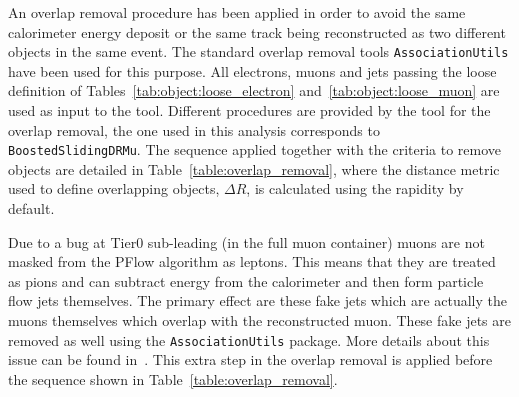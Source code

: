 An overlap removal procedure has been applied in order to avoid the same calorimeter energy deposit or the same track being reconstructed as two different objects in the same event.  The standard overlap removal tools \texttt{AssociationUtils} have been used for this purpose. All electrons, muons and jets passing  the loose definition of Tables~\ref{tab:object:loose_electron} and~\ref{tab:object:loose_muon}  are used as input to the tool.  Different procedures are provided by the tool for the overlap removal, the one used in this analysis corresponds to \texttt{BoostedSlidingDRMu}.  The sequence applied together with the criteria to remove objects are detailed in Table~\ref{table:overlap_removal},  where the distance metric used to define overlapping objects, \(\Delta R\), is calculated using the rapidity by default.

 Due to a bug at Tier0 sub-leading (in the full muon container) muons are not masked from the PFlow algorithm as leptons. This means that they are treated as pions and can subtract energy from the calorimeter and then form particle flow jets themselves.  The primary effect are these fake jets which are actually the muons themselves which overlap with the reconstructed muon. These fake jets are removed as well using the  \texttt{AssociationUtils} package. More details about this issue can be found in~\cite{twiki:HowToCleanJets2017}. This extra step in the overlap removal is applied before the sequence shown in Table~\ref{table:overlap_removal}. 


